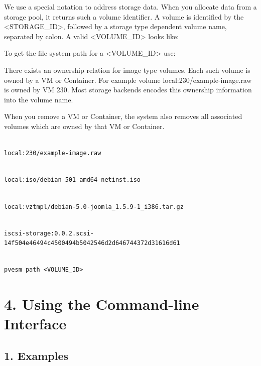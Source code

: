 We use a special notation to address storage data. When you allocate data from a storage pool, it returns such a volume identifier. A volume is identified by the <STORAGE_ID>, followed by a storage type dependent volume name, separated by colon. A valid <VOLUME_ID> looks like:

To get the file system path for a <VOLUME_ID> use:

There exists an ownership relation for image type volumes. Each such volume is owned by a VM or Container. For example volume local:230/example-image.raw is owned by VM 230. Most storage backends encodes this ownership information into the volume name.

When you remove a VM or Container, the system also removes all associated volumes which are owned by that VM or Container.

\begin{lstlisting}

local:230/example-image.raw

\end{lstlisting}

\begin{lstlisting}

local:iso/debian-501-amd64-netinst.iso

\end{lstlisting}

\begin{lstlisting}

local:vztmpl/debian-5.0-joomla_1.5.9-1_i386.tar.gz

\end{lstlisting}

\begin{lstlisting}

iscsi-storage:0.0.2.scsi-14f504e46494c4500494b5042546d2d646744372d31616d61

\end{lstlisting}

\begin{lstlisting}

pvesm path <VOLUME_ID>

\end{lstlisting}


\section{4. Using the Command-line Interface}

\subsection{1. Examples}

